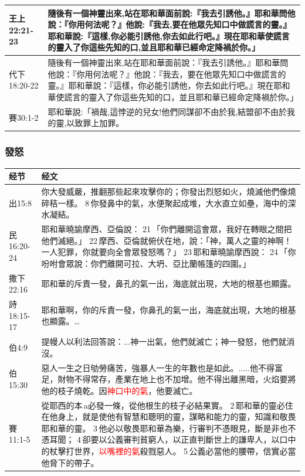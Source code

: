 \begin{table}[H]
\begin{tabular}{p{6em}p{42em}}
王上22:21-23&隨後有一個神靈出來,站在耶和華面前說:『我去引誘他。』耶和華問他說：『你用何法呢？』他說:『我去,要在他眾先知口中做謊言的靈。』耶和華說:『這樣,你必能引誘他,你去如此行吧。』現在耶和華使謊言的靈入了你這些先知的口,並且耶和華已經命定降禍於你。」\\  \midrule

代下18:20-22&隨後有一個神靈出來,站在耶和華面前說：『我去引誘他。』耶和華問他說：『你用何法呢？』他說：『我去，要在他眾先知口中做謊言的靈。』耶和華說：『這樣，你必能引誘他，你去如此行吧。』現在耶和華使謊言的靈入了你這些先知的口，並且耶和華已經命定降禍於你。」\\  \midrule
賽30:1-2&耶和華說:「禍哉,這悖逆的兒女!他們同謀卻不由於我,結盟卻不由於我的靈,以致罪上加罪。\\  \midrule
\end{tabular}
\end{table}


\subsubsection{發怒}
\begin{table}[H]
\centering
\begin{tabular}{p{6em}p{40em}}  \toprule
经节&经文 \\  \midrule
出15:8&你大發威嚴，推翻那些起來攻擊你的；你發出烈怒如火，燒滅他們像燒碎秸一樣。 8 你發鼻中的氣，水便聚起成堆，大水直立如壘，海中的深水凝結。\\  \midrule
民16:20-24&耶和華曉諭摩西、亞倫說： 21 「你們離開這會眾，我好在轉眼之間把他們滅絕。」 22 摩西、亞倫就俯伏在地，說：「神，萬人之靈的神啊！一人犯罪，你就要向全會眾發怒嗎？」 23 耶和華曉諭摩西說： 24 「你吩咐會眾說：你們離開可拉、大坍、亞比蘭帳篷的四圍。」\\  \midrule

撒下22:16&耶和華的斥責一發，鼻孔的氣一出，海底就出現，大地的根基也顯露。 \\  \midrule
詩18:15-17&耶和華啊，你的斥責一發，你鼻孔的氣一出，海底就出現，大地的根基也顯露。…\\  \midrule

伯4:9&提幔人以利法回答說：...神一出氣，他們就滅亡；神一發怒，他們就消沒。\\  \midrule
伯15:30&惡人一生之日劬勞痛苦，強暴人一生的年數也是如此。.....他不得富足，財物不得常存，產業在地上也不加增。他不得出離黑暗，火焰要將他的枝子燒乾。因\textcolor{red}{神口中的氣}，他要滅亡。\\  \midrule
賽11:1-5&從耶西的本 a必發一條，從他根生的枝子必結果實。 2 耶和華的靈必住在他身上，就是使他有智慧和聰明的靈，謀略和能力的靈，知識和敬畏耶和華的靈。 3 他必以敬畏耶和華為樂，行審判不憑眼見，斷是非也不憑耳聞； 4 卻要以公義審判貧窮人，以正直判斷世上的謙卑人，以口中的杖擊打世界，\textcolor{red}{以嘴裡的氣}殺戮惡人。 5 公義必當他的腰帶，信實必當他脅下的帶子。\\  \midrule

\end{tabular}
\end{table}

